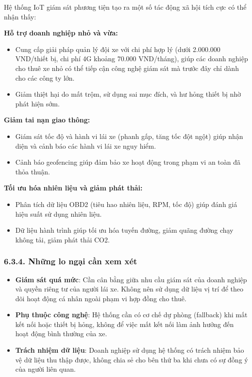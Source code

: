\documentclass[13pt,a4paper]{extarticle}
\renewcommand{\\}{\thesislongtableorignewline\hline}%
\providecommand{\tightlist}{%
  \setlength{\itemsep}{0pt}\setlength{\parskip}{0pt}}
\begin{document}
Hệ thống IoT giám sát phương tiện tạo ra một số tác động xã hội tích cực
có thể nhận thấy:

\textbf{Hỗ trợ doanh nghiệp nhỏ và vừa:}

\begin{itemize}
\tightlist
\item
  Cung cấp giải pháp quản lý đội xe với chi phí hợp lý (dưới 2.000.000
  VND/thiết bị, chi phí 4G khoảng 70.000 VND/tháng), giúp các doanh
  nghiệp cho thuê xe nhỏ có thể tiếp cận công nghệ giám sát mà trước đây
  chỉ dành cho các công ty lớn.
\item
  Giảm thiệt hại do mất trộm, sử dụng sai mục đích, và hư hỏng thiết bị
  nhờ phát hiện sớm.
\end{itemize}

\textbf{Giảm tai nạn giao thông:}

\begin{itemize}
\tightlist
\item
  Giám sát tốc độ và hành vi lái xe (phanh gấp, tăng tốc đột ngột) giúp
  nhận diện và cảnh báo các hành vi lái xe nguy hiểm.
\item
  Cảnh báo geofencing giúp đảm bảo xe hoạt động trong phạm vi an toàn đã
  thỏa thuận.
\end{itemize}

\textbf{Tối ưu hóa nhiên liệu và giảm phát thải:}

\begin{itemize}
\tightlist
\item
  Phân tích dữ liệu OBD2 (tiêu hao nhiên liệu, RPM, tốc độ) giúp đánh
  giá hiệu suất sử dụng nhiên liệu.
\item
  Dữ liệu hành trình giúp tối ưu hóa tuyến đường, giảm quãng đường chạy
  không tải, giảm phát thải CO2.
\end{itemize}

\subsubsection{6.3.4. Những lo ngại cần xem
xét}\label{634-nhux1eefng-lo-ngux1ea1i-cux1ea7n-xem-xuxe9t}

\begin{itemize}
\tightlist
\item
  \textbf{Giám sát quá mức}: Cần cân bằng giữa nhu cầu giám sát của
  doanh nghiệp và quyền riêng tư của người lái xe. Không nên sử dụng dữ
  liệu vị trí để theo dõi hoạt động cá nhân ngoài phạm vi hợp đồng cho
  thuê.
\item
  \textbf{Phụ thuộc công nghệ}: Hệ thống cần có cơ chế dự phòng
  (fallback) khi mất kết nối hoặc thiết bị hỏng, không để việc mất kết
  nối làm ảnh hưởng đến hoạt động bình thường của xe.
\item
  \textbf{Trách nhiệm dữ liệu}: Doanh nghiệp sử dụng hệ thống có trách
  nhiệm bảo vệ dữ liệu thu thập được, không chia sẻ cho bên thứ ba khi
  chưa có sự đồng ý của người liên quan.
\end{itemize}
\end{document}
